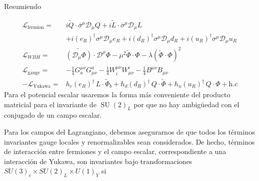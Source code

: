 \begin{frame}
Resumiendo

\begin{align}
  \label{eq:smscalar}
\mathcal{L}_{\text{fermion}}=&i\widetilde{Q}\cdot \overline{\sigma}^\mu\mathcal{D}_\mu Q+i\widetilde{L}\cdot \overline{\sigma}^\mu\mathcal{D}_\mu L \nonumber\\
&+i(e_R)^{\dagger}\sigma^\mu\mathcal{D}_\mu {e_R}+i(d_R)^{\dagger}\sigma^\mu\mathcal{D}_\mu {d_R}+i(u_R)^{\dagger}\sigma^\mu\mathcal{D}_\mu {u_R}\nonumber\\
  \mathcal{L}_{WBH}=&\widetilde{\left( \mathcal{D}_\mu{\Phi} \right)}\cdot\mathcal{D}^\mu\Phi-\mu^2\widetilde{\Phi}\cdot\Phi-\lambda \left( \widetilde{\Phi}\cdot\Phi \right)^2 \nonumber\\
\mathcal{L}_{\text{gauge}}=& -\tfrac{1}{4}G^{\mu\nu}_a G_{\mu\nu}^a-\tfrac{1}{4}W^{\mu\nu}_i W_{\mu\nu}^i-\tfrac{1}{4}B^{\mu\nu} B_{\mu\nu}\nonumber\\
-\mathcal{L}_{\text{Yukawa}}=&  h_e \left( e_R \right)^{\dagger}\,L\cdot \widetilde{\Phi}_b +
      h_d \left( d_R \right)^{\dagger}\,Q\cdot \widetilde{\Phi} +
      h_u \left( u_R \right)^{\dagger}\,Q\cdot {\Phi}+\text{h.c}
\end{align}
Para el potencial escalar usaremos la forma más conveniente del producto matricial para el invariante de $\operatorname{SU}(2)_L$ por que no hay ambigüedad con el conjugado de un campo escalar.

Para los campos del Lagrangiano, debemos asegurarnos de que todos los términos invariantes gauge locales y renormalizables sean considerados. De hecho, términos de interacción entre fermiones y el campo escalar, correspondiente a una interacción de Yukawa, son invariantes bajo transformaciones $SU(3)_c\times  SU(2)_L\times  U(1)_Y$ si
\end{frame}
